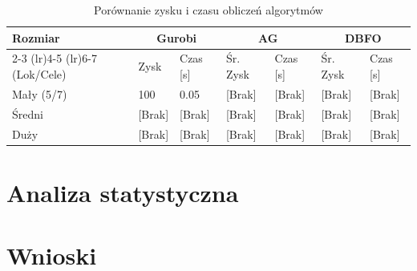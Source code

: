 \documentclass[11pt, a4paper]{article}
\begin{document}
\begin{table}[H]
\centering
\caption{Porównanie zysku i czasu obliczeń algorytmów}
\label{tab:wyniki}
\begin{tabularx}{\textwidth}{l *{6}{X}}
\toprule
\textbf{Rozmiar} & \multicolumn{2}{c}{\textbf{Gurobi}} & \multicolumn{2}{c}{\textbf{AG}} & \multicolumn{2}{c}{\textbf{DBFO}} \\
\cmidrule(lr){2-3} \cmidrule(lr){4-5} \cmidrule(lr){6-7}
(Lok/Cele) & Zysk & Czas [s] & Śr. Zysk & Czas [s] & Śr. Zysk & Czas [s] \\
\midrule
Mały (5/7)  & 100 & 0.05 & [Brak] & [Brak] & [Brak] & [Brak] \\
Średni      & [Brak] & [Brak] & [Brak] & [Brak] & [Brak] & [Brak] \\
Duży        & [Brak] & [Brak] & [Brak] & [Brak] & [Brak] & [Brak] \\
\bottomrule
\end{tabularx}
\end{table}

\section{Analiza statystyczna}


\section{Wnioski}
\end{document}
